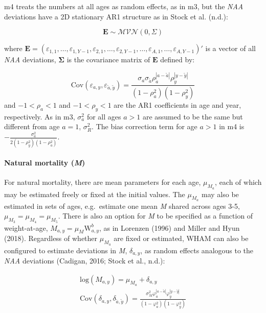 \documentclass[]{article}
\let\oldparagraph\paragraph
\renewcommand{\paragraph}[1]{\oldparagraph{#1}\mbox{}}
\begin{document}
m4 treats the numbers at all ages as random effects, as in m3, but the
\emph{NAA} deviations have a 2D stationary AR1 structure as in Stock et
al. (n.d.):

\[\mathbf{E} \sim \mathcal{MVN} \left( 0, \Sigma \right)\]

where
\(\mathbf{E} = (\varepsilon_{1,1}, \ldots, \varepsilon_{1,Y-1}, \varepsilon_{2,1}, \ldots, \varepsilon_{2,Y-1}, \ldots, \varepsilon_{A,1}, \ldots, \varepsilon_{A,Y-1})'\)
is a vector of all \emph{NAA} deviations, \(\boldsymbol{\Sigma}\) is the
covariance matrix of \(\mathbf{E}\) defined by:

\[ \text{Cov} \left( \varepsilon_{a,y}, \varepsilon_{\tilde{a},\tilde{y}} \right) = \frac{\sigma_a \sigma_{\tilde{a}} \rho^{|a-\tilde{a}|}_{a} \rho^{|y-\tilde{y}|}_{y}}{\left(1-\rho^2_{a}\right) \left(1-\rho^2_{y}\right)}\]
and \(-1<\rho_a<1\) and \(-1<\rho_y<1\) are the AR1 coefficients in age
and year, respectively. As in m3, \(\sigma^2_a\) for all ages \(a > 1\)
are assumed to be the same but different from age \(a = 1\),
\(\sigma^2_R\). The bias correction term for age \(a > 1\) in m4 is
\(- \frac{\sigma^2_a}{2 (1-\rho^2_y)(1-\rho^2_a)}\).

\hypertarget{natural-mortality-m}{%
\paragraph{\texorpdfstring{Natural mortality
(\emph{M})}{Natural mortality (M)}}\label{natural-mortality-m}}

For natural mortality, there are mean parameters for each age,
\(\mu_{M_a}\), each of which may be estimated freely or fixed at the
initial values. The \(\mu_{M_a}\) may also be estimated in sets of ages,
e.g.~estimate one mean \emph{M} shared across ages 3-5,
\(\mu_{M_3} = \mu_{M_4} = \mu_{M_5}\). There is also an option for
\emph{M} to be specified as a function of weight-at-age,
\(M_{a,y} = \mu_M \text{W}^b_{a,y}\), as in Lorenzen (1996) and Miller
and Hyun (2018). Regardless of whether \(\mu_{M_a}\) are fixed or
estimated, WHAM can also be configured to estimate deviations in
\emph{M}, \(\delta_{a,y}\), as random effects analogous to the
\emph{NAA} deviations (Cadigan, 2016; Stock et al., n.d.):

\begin{equation}
  \begin{array}{cc}
    \text{log}\left( M_{a,y} \right) = \mu_{M_a} + \delta_{a,y} \\
    \text{Cov} \left( \delta_{a,y}, \delta_{\tilde{a},\tilde{y}} \right) = \frac{\sigma^2_M \varphi^{|a-\tilde{a}|}_{a} \varphi^{|y-\tilde{y}|}_{y}}{\left(1-\varphi^2_{a}\right) \left(1-\varphi^2_{y}\right)}
  \end{array}
\end{equation}
\end{document}
